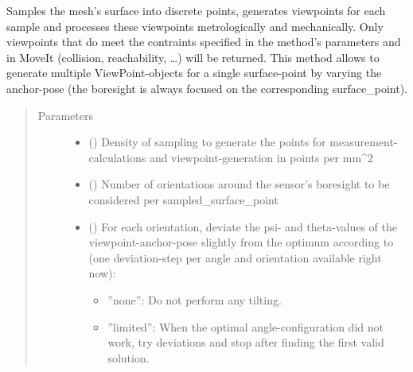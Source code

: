 \documentclass[letterpaper,10pt,english]{sphinxmanual}
\begin{document}
\begin{fulllineitems}
\begin{fulllineitems}
\label{\detokenize{module_trajectory_manager:agiprobot_measurement.trajectory_manager.TrajectoryManager.generate_samples_and_viewpoints}}
Samples the mesh’s surface into discrete points, generates viewpoints for each sample and processes these viewpoints metrologically and mechanically.
Only viewpoints that do meet the contraints specified in the method’s parameters and in MoveIt (collision, reachability, …) will be returned. This method allows to generate
multiple ViewPoint-objects for a single surface-point by varying the anchor-pose (the boresight is always focused on the corresponding surface\_point).
\begin{quote}\begin{description}
\item[{Parameters}] \leavevmode\begin{itemize}
\item {} 
 () \textendash{} Density of sampling to generate the points for measurement-calculations and viewpoint-generation in points per mm\textasciicircum{}2

\item {} 
 () \textendash{} Number of orientations around the sensor’s boresight to be considered per sampled\_surface\_point

\item {} 
 (\sphinxstyleliteralemphasis{, }) \textendash{} 
For each orientation, deviate the psi- and theta-values of the viewpoint-anchor-pose slightly from the optimum according to (one deviation-step per angle and orientation available right now):
\begin{itemize}
\item {} 
”none”: Do not perform any tilting.

\item {} 
”limited”: When the optimal angle-configuration did not work, try deviations and stop after finding the first valid solution.


\end{itemize}
\end{itemize}
\end{description}
\end{quote}
\end{fulllineitems}
\end{fulllineitems}
\end{document}
